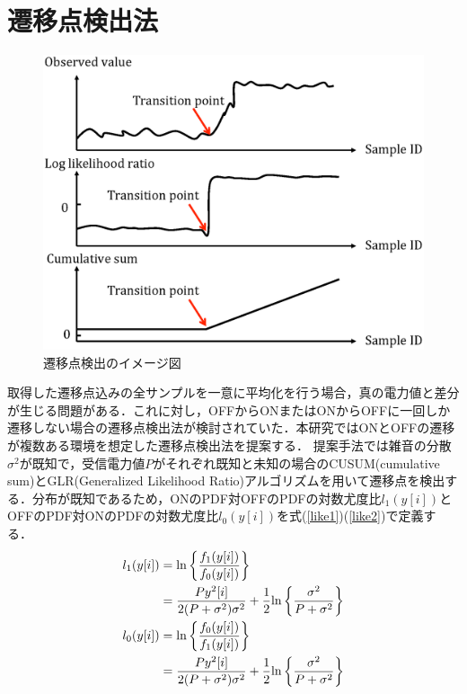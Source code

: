 \documentclass[technicalreport]{ieicej}
\begin{document}
\section{遷移点検出法}
\label{sec:transition}


\begin{figure}[t]
\centering
\includegraphics[width=0.8\hsize,clip]{cusum_image.eps}
\caption{遷移点検出のイメージ図}
\label{systemmodel}
\end{figure}
取得した遷移点込みの全サンプルを一意に平均化を行う場合，真の電力値と差分が生じる問題がある．これに対し，OFFからONまたはONからOFFに一回しか遷移しない場合の遷移点検出法が検討されていた\cite{ref:quickest}．本研究ではONとOFFの遷移が複数ある環境を想定した遷移点検出法を提案する．
提案手法では雑音の分散$\sigma^2$が既知で，受信電力値$P$がそれぞれ既知と未知の場合のCUSUM(cumulative sum)とGLR(Generalized Likelihood Ratio)アルゴリズムを用いて遷移点を検出する．分布が既知であるため，ONのPDF対OFFのPDFの対数尤度比$l_{1}(y[i])$とOFFのPDF対ONのPDFの対数尤度比$l_{0}(y[i])$を式(\ref{like1})(\ref{like2})で定義する．
\begin{align}
l_{1}(y[i]) &= {\rm ln}\left\{\frac{f_1(y[i])}{f_0(y[i])}\right\} \label{like1} \\
&=\frac{Py^2[i]}{2(P+\sigma^2)\sigma^2} + \frac{1}{2}{\rm ln}\left\{\frac{\sigma^2}{P+\sigma^2}\right\} \nonumber \\
l_{0}(y[i]) &= {\rm ln}\left\{\frac{f_0(y[i])}{f_1(y[i])}\right\} \label{like2} \\
&=\frac{Py^2[i]}{2(P+\sigma^2)\sigma^2} + \frac{1}{2}{\rm ln}\left\{\frac{\sigma^2}{P+\sigma^2}\right\} \nonumber
\end{align}
\end{document}
